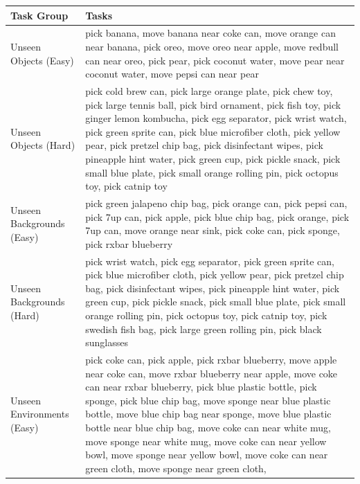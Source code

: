 \begin{table}[ht]
\small
\begin{center}
\begin{tabular}{p{}p{}}
\toprule
\textbf{Task Group} & \textbf{Tasks} \\
\midrule
Unseen Objects (Easy) & pick banana, move banana near coke can, move orange can near banana, pick oreo, move oreo near apple, move redbull can near oreo, pick pear, pick coconut water, move pear near coconut water, move pepsi can near pear \\
\midrule
Unseen Objects (Hard) & pick cold brew can, pick large orange plate, pick chew toy, pick large tennis ball, pick bird ornament, pick fish toy, pick ginger lemon kombucha, pick egg separator, pick wrist watch, pick green sprite can, pick blue microfiber cloth, pick yellow pear, pick pretzel chip bag, pick disinfectant wipes, pick pineapple hint water, pick green cup, pick pickle snack, pick small blue plate, pick small orange rolling pin, pick octopus toy, pick catnip toy \\
\midrule
Unseen Backgrounds (Easy) & pick green jalapeno chip bag, pick orange can, pick pepsi can, pick 7up can, pick apple, pick blue chip bag, pick orange, pick 7up can, move orange near sink, pick coke can, pick sponge, pick rxbar blueberry \\
\midrule
Unseen Backgrounds (Hard) & pick wrist watch, pick egg separator, pick green sprite can, pick blue microfiber cloth, pick yellow pear, pick pretzel chip bag, pick disinfectant wipes, pick pineapple hint water, pick green cup, pick pickle snack, pick small blue plate, pick small orange rolling pin, pick octopus toy, pick catnip toy, pick swedish fish bag, pick large green rolling pin, pick black sunglasses \\
\midrule
Unseen Environments (Easy) &
    pick coke can,
            pick apple,
            pick rxbar blueberry,
            move apple near coke can,
            move rxbar blueberry near apple,
            move coke can near rxbar blueberry,
            pick blue plastic bottle,
            pick sponge,
            pick blue chip bag,
            move sponge near blue plastic bottle,
            move blue chip bag near sponge,
            move blue plastic bottle near blue chip bag,
            move coke can near white mug,
            move sponge near white mug,
            move coke can near yellow bowl,
            move sponge near yellow bowl,
            move coke can near green cloth,
            move sponge near green cloth,

\end{tabular}
\end{center}
\end{table}
